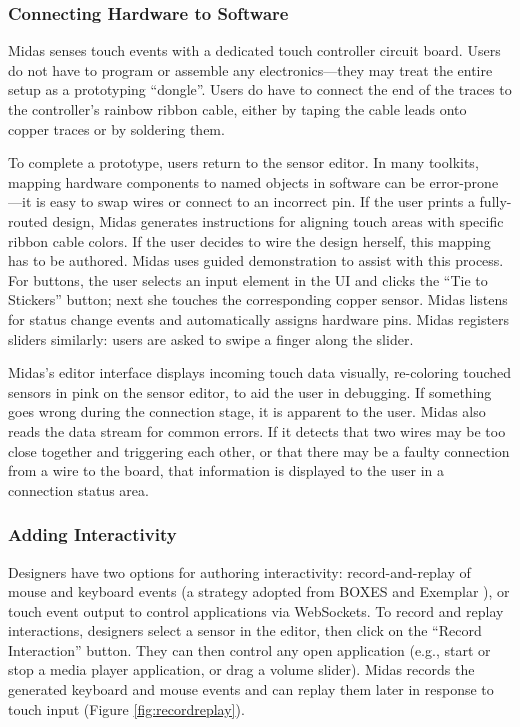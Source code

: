         \subsubsection{Connecting Hardware to Software}
Midas senses touch events with a dedicated touch controller
circuit board. Users do not have to program or assemble any
electronics---they may treat the entire setup as a prototyping
“dongle”. Users do have to connect the end of the traces to
the controller's rainbow ribbon cable, either by taping the
cable leads onto copper traces or by soldering them.

To complete a prototype, users return to the sensor editor. In
many toolkits, mapping hardware components to named objects
in software can be error-prone---it is easy to swap wires
or connect to an incorrect pin. If the user prints a fully-routed
design, Midas generates instructions for aligning touch areas
with specific ribbon cable colors. If the user decides to wire 
the design herself, this mapping has to be authored. Midas
uses guided demonstration to assist with this process. For
buttons, the user selects an input element in the UI and clicks
the ``Tie to Stickers'' button; next she touches the corresponding
copper sensor. Midas listens for status change events and
automatically assigns hardware pins. Midas registers sliders
similarly: users are asked to swipe a finger along the slider.

Midas's editor interface displays incoming touch data visually,
re-coloring touched sensors in pink on the sensor editor,
to aid the user in debugging. If something goes wrong during
the connection stage, it is apparent to the user. Midas
also reads the data stream for common errors. If it detects
that two wires may be too close together and triggering each
other, or that there may be a faulty connection from a wire
to the board, that information is displayed to the user in a
connection status area.

        \subsubsection{Adding Interactivity}
Designers have two options for authoring interactivity: record-and-replay
of mouse and keyboard events (a strategy adopted
from BOXES \cite{hudson-boxes} and Exemplar \cite{hartmann-exemplar}), or touch event output
to control applications via WebSockets. To record and replay
interactions, designers select a sensor in the editor, then click
on the ``Record Interaction'' button. They can then control any
open application (e.g., start or stop a media player application,
or drag a volume slider). Midas records the generated
keyboard and mouse events and can replay them later in response
to touch input (Figure \ref{fig:recordreplay}).

